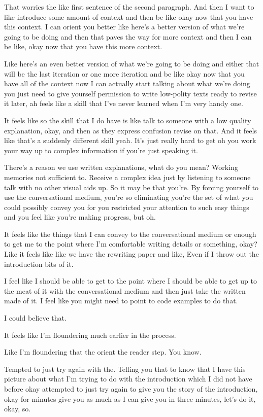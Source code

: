 \begin{subappendices}
That worries the like first sentence of the second paragraph. And then I want to like introduce some amount of context and then be like okay now that you have this context. I can orient you better like here's a better version of what we're going to be doing and then that paves the way for more context and then I can be like, okay now that you have this more context. 

Like here's an even better version of what we're going to be doing and either that will be the last iteration or one more iteration and be like okay now that you have all of the context now I can actually start talking about what we're doing you just need to give yourself permission to write low-polity texts ready to revise it later, ah feels like a skill that I've never learned when I'm very handy one. 

It feels like so the skill that I do have is like talk to someone with a low quality explanation, okay, and then as they express confusion revise on that. And it feels like that's a suddenly different skill yeah. It's just really hard to get oh you work your way up to complex information if you're just speaking it. 

There's a reason we use written explanations, what do you mean? Working memories not sufficient to. Receive a complex idea just by listening to someone talk with no other visual aids up. So it may be that you're. By forcing yourself to use the conversational medium, you're so eliminating you're the set of what you could possibly convey you for you restricted your attention to such easy things and you feel like you're making progress, but oh. 

It feels like the things that I can convey to the conversational medium or enough to get me to the point where I'm comfortable writing details or something, okay? Like it feels like like we have the rewriting paper and like, Even if I throw out the introduction bits of it. 

I feel like I should be able to get to the point where I should be able to get up to the meat of it with the conversational medium and then just take the written made of it. I feel like you might need to point to code examples to do that. 

I could believe that. 

It feels like I'm floundering much earlier in the process. 

Like I'm floundering that the orient the reader step. You know. 

Tempted to just try again with the. Telling you that to know that I have this picture about what I'm trying to do with the introduction which I did not have before okay attempted to just try again to give you the story of the introduction, okay for minutes give you as much as I can give you in three minutes, let's do it, okay, so. 


\end{subappendices}
